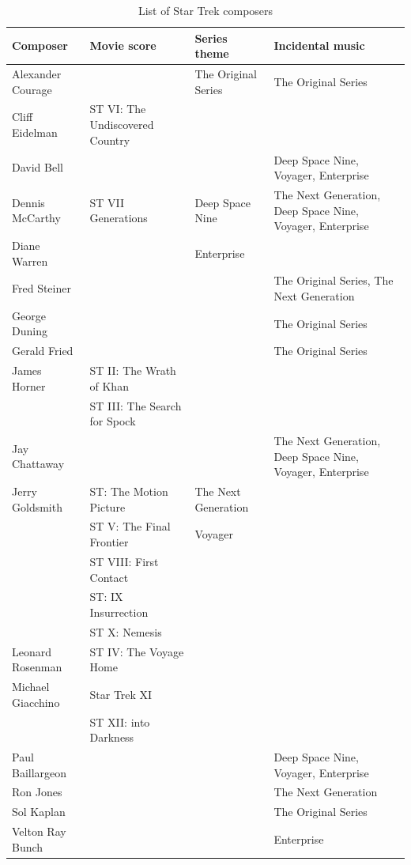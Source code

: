 \begin{table}
\small
\begin{tabularx}{\linewidth}{lllX}
\toprule
	\textbf{Composer}	& \textbf{Movie score} 				& \textbf{Series theme} 			& \textbf{Incidental music} \\
\midrule
	Alexander Courage 	& 								& The Original Series 			& The Original Series \\
	Cliff Eidelman 		& ST VI: The Undiscovered Country 		&  							&  \\     
	David Bell			&  								&  							& Deep Space Nine, Voyager, Enterprise \\ 
	Dennis McCarthy 	& ST VII Generations 				& Deep Space Nine 				& The Next Generation, Deep Space Nine, Voyager, Enterprise \\
	Diane Warren 		&  								& Enterprise 					&  \\    
	Fred Steiner 		&  								&  							& The Original Series, The Next Generation \\     
	George Duning 	&  								&  							& The Original Series \\     
	Gerald Fried 		& 								&  							& The Original Series \\     
	James Horner 		& ST II: The Wrath of Khan			&  							&  \\   
					& ST III: The Search for Spock 			&  							&  \\     
	Jay Chattaway 		&  								& 							& The Next Generation, Deep Space Nine, Voyager, Enterprise  \\    
	Jerry Goldsmith 	& ST: The Motion Picture				& The Next Generation   			&  \\     
					& ST V: The Final Frontier				& Voyager						&  \\     
					& ST VIII: First Contact				& 		 					&  \\     
					& ST: IX Insurrection					&  							&  \\     
					& ST X: Nemesis 					&  							&  \\     
	Leonard Rosenman 	& ST IV: The Voyage Home 			&  							&  \\     
	Michael Giacchino 	& Star Trek XI						&							&  \\
					& ST XII: into Darkness 				&  							&  \\     
	Paul Baillargeon 	&  								& 							& Deep Space Nine, Voyager, Enterprise \\ 
	Ron Jones 		&  								&  							& The Next Generation \\ 
	Sol Kaplan 		&  								&  							& The Original Series \\ 
	Velton Ray Bunch 	&  								&  							& Enterprise \\     
\bottomrule
\end{tabularx}
\caption{List of Star Trek composers}
\label{tb:star trek composers}
\end{table}

